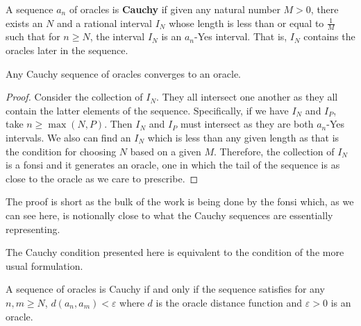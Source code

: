 \documentclass[12pt]{article}
\begin{document}
A sequence $a_n$ of oracles is \textbf{Cauchy} if given any natural number $M > 0$, there exists an $N$ and a rational interval $I_N$ whose length is less than or equal to $\frac{1}{M}$ such that for $n \geq N$, the interval $I_N$ is an $a_n$-Yes interval. That is, $I_N$ contains the oracles later in the sequence. 

\begin{theorem}\label{th:cauchy}
Any Cauchy sequence of oracles converges to an oracle. 
\end{theorem}

\begin{proof}
    Consider the collection of $I_N$. They all intersect one another as they all contain the latter elements of the sequence. Specifically, if we have $I_N$ and $I_P$, take $n \geq \max(N, P)$. Then $I_N$ and $I_P$ must intersect as they are both $a_n$-Yes intervals. We also can find an $I_N$ which is less than any given length as that is the condition for choosing $N$ based on a given $M$. Therefore, the collection of $I_N$ is a fonsi and it generates an oracle, one in which the tail of the sequence is as close to the oracle as we care to prescribe.     
\end{proof}

The proof is short as the bulk of the work is being done by the fonsi which, as we can see here, is notionally close to what the Cauchy sequences are essentially representing. 

The Cauchy condition presented here is equivalent to the condition of the more usual formulation.

\begin{proposition}
    A sequence of oracles is Cauchy if and only if the sequence satisfies for any $n, m \geq N$, $d(a_n,  a_m) < \varepsilon$ where $d$ is the oracle distance function and $\varepsilon > 0$ is an oracle. 
\end{proposition} 
\end{document}
